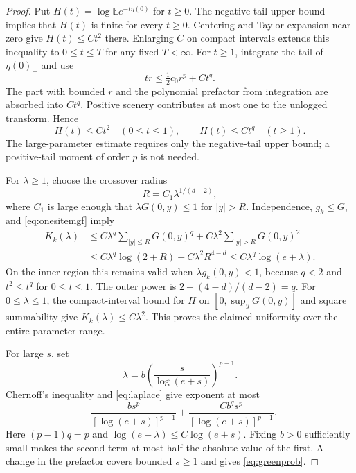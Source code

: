 \documentclass[11pt]{amsart}
\theoremstyle{remark}
\newcommand{\E}{\mathbb E}
\begin{document}
\begin{proof}
Put $H(t)=\log\E e^{-t\eta(0)}$ for $t\ge0$.
The negative-tail upper bound implies that $H(t)$ is finite for every
$t\ge0$. Centering and Taylor expansion near zero give $H(t)\le Ct^2$
there. Enlarging $C$ on compact intervals extends this inequality to
$0\le t\le T$ for any fixed $T<\infty$.
For $t\ge1$, integrate the tail of $\eta(0)_-$ and use
\[
 tr\le\tfrac12c_0r^p+C t^q.
\]
The part with bounded $r$ and the polynomial prefactor from integration
are absorbed into $Ct^q$. Positive scenery contributes at most one to
the unlogged transform. Hence
\begin{equation}\label{eq:onesitemgf}
 H(t)\le Ct^2\quad(0\le t\le1),\qquad
 H(t)\le Ct^q\quad(t\ge1).
\end{equation}
The large-parameter estimate requires only the negative-tail upper
bound; a positive-tail moment of order $p$ is not needed.

For $\lambda\ge1$, choose the crossover radius
\begin{equation}\label{eq:crossover}
 R=C_1\lambda^{1/(d-2)},
\end{equation}
where $C_1$ is large enough that $\lambda G(0,y)\le1$ for $|y|>R$.
Independence, $g_k\le G$, and \eqref{eq:onesitemgf} imply
\begin{align*}
 K_k(\lambda)
 &\le C\lambda^q\sum_{|y|\le R}G(0,y)^q
       +C\lambda^2\sum_{|y|>R}G(0,y)^2\\
 &\le C\lambda^q\log(2+R)+C\lambda^2R^{4-d}
 \le C\lambda^q\log(e+\lambda).
\end{align*}
On the inner region this remains valid when $\lambda g_k(0,y)<1$,
because $q<2$ and $t^2\le t^q$ for $0\le t\le1$.
The outer power is $2+(4-d)/(d-2)=q$.
For $0\le\lambda\le1$, the compact-interval bound for $H$ on
$[0,\sup_yG(0,y)]$ and square summability give $K_k(\lambda)\le C\lambda^2$.
This proves the claimed uniformity over the entire parameter range.

For large $s$, set
\begin{equation}\label{eq:lambdaopt}
 \lambda=b\left(\frac{s}{\log(e+s)}\right)^{p-1}.
\end{equation}
Chernoff's inequality and \eqref{eq:laplace} give exponent at most
\[
 -\frac{b s^p}{[\log(e+s)]^{p-1}}
 +\frac{C b^q s^p}{[\log(e+s)]^{p-1}}.
\]
Here $(p-1)q=p$ and $\log(e+\lambda)\le C\log(e+s)$.
Fixing $b>0$ sufficiently small makes the second term at most half the
absolute value of the first. A change in the prefactor covers bounded
$s\ge1$ and gives \eqref{eq:greenprob}.
\end{proof}
\end{document}
